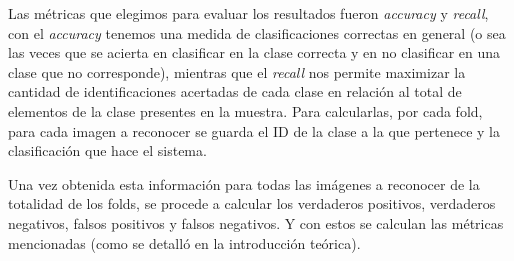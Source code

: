 \par Las métricas que elegimos para evaluar los resultados fueron \textit{accuracy} y \textit{recall}, con el \textit{accuracy} tenemos una medida de clasificaciones correctas en general (o sea las veces que se acierta en clasificar en la clase correcta y en no clasificar en una clase que no corresponde), mientras que el \textit{recall} nos permite maximizar la cantidad de identificaciones acertadas de cada clase en relación al total de elementos de la clase presentes en la muestra.
Para calcularlas, por cada fold, para cada imagen a reconocer se guarda el ID de la clase a la que pertenece y la clasificación que hace el sistema.
\par Una vez obtenida esta información para todas las imágenes a reconocer de la totalidad de los folds, se procede a calcular los verdaderos positivos, verdaderos negativos, falsos positivos y falsos negativos. Y con estos se calculan las métricas mencionadas (como se detalló en la introducción teórica).